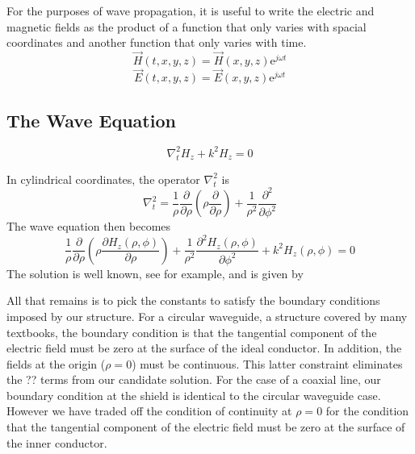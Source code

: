 \documentclass[11pt]{article}
\begin{document}
For the purposes of wave propagation, it is useful to write the
electric and magnetic fields as the product of a function that only
varies with spacial coordinates and another function that only varies
with time.
\begin{equation}
\vec{H}(t,x,y,z) = \vec{H}(x,y,z) \mathrm{e}^{j \omega t}
\end{equation}
\begin{equation}
\vec{E}(t,x,y,z) = \vec{E}(x,y,z) \mathrm{e}^{j \omega t}
\end{equation}

\subsection{The Wave Equation}

\begin{equation}
\nabla_t^2 H_z + k^2 H_z = 0
\end{equation}

In cylindrical coordinates, the operator $\nabla_t^2$ is
\begin{equation}
\nabla_t^2 = \frac{1}{\rho} \frac{\partial}{\partial \rho}
\left(\rho \frac{\partial}{\partial \rho} \right) + 
\frac{1}{\rho^2}\frac{\partial^2}{\partial \phi^2}
\end{equation}
The wave equation then becomes
\begin{equation}
\frac{1}{\rho} \frac{\partial}{\partial \rho}
\left(\rho \frac{\partial H_z\left(\rho, \phi\right)}{\partial \rho} \right) + 
\frac{1}{\rho^2}\frac{\partial^2 H_z\left(\rho, \phi\right)}{\partial
  \phi^2} + k^2 H_z\left(\rho, \phi\right) = 0
\end{equation}
The solution is well known, see \cite{terman} for example, and is
given by
\begin{equation}
\end{equation}

All that remains is to pick the constants to satisfy the boundary
conditions imposed by our structure.  For a circular waveguide, a
structure covered by many textbooks, the boundary condition is that
the tangential component of the electric field must be zero at the
surface of the ideal conductor.  In addition, the fields at the origin
($\rho = 0$) must be continuous.  This latter constraint eliminates
the ?? terms from our candidate solution.  For the case of a coaxial
line, our boundary condition at the shield is identical to the
circular waveguide case.  However we have traded off the condition of
continuity at $\rho = 0$ for the condition that the tangential
component of the electric field must be zero at the surface of the
inner conductor.



\appendix
\cite{terman}

\end{document}
